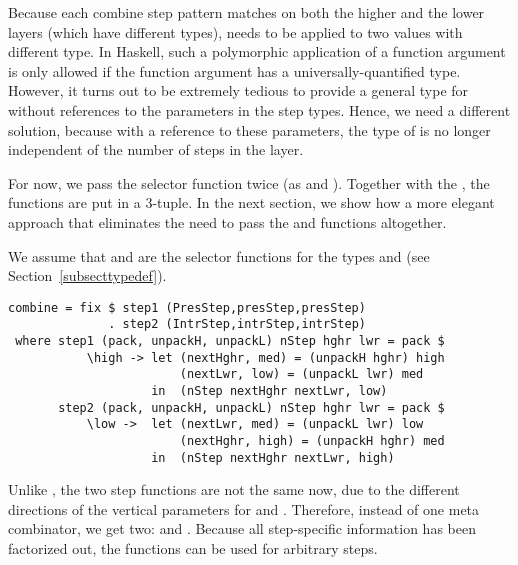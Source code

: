 \documentclass[preprint,natbib]{sigplanconf}
\begin{document}
Because each combine step pattern matches on both the higher and the lower layers (which have different types),  needs to be applied to two values with different type. In Haskell, such a polymorphic application of a function argument is only allowed if the function argument has a universally-quantified type. However, it turns out to be extremely tedious to provide a general type for  without references to the parameters in the step types. Hence, we need a different solution, because with a reference to these parameters, the type of  is no longer independent of the number of steps in the layer.

For now, we pass the selector function twice (as  and ).  Together with the , the  functions are put in a 3-tuple. In the next section, we show how a more elegant approach that eliminates the need to pass the  and  functions altogether.

We assume that  and  are the selector functions for the types  and  (see Section~\ref{subsecttypedef}).

\begin{small}
\begin{verbatim}
combine = fix $ step1 (PresStep,presStep,presStep) 
              . step2 (IntrStep,intrStep,intrStep) 
 where step1 (pack, unpackH, unpackL) nStep hghr lwr = pack $
           \high -> let (nextHghr, med) = (unpackH hghr) high
                        (nextLwr, low) = (unpackL lwr) med
                    in  (nStep nextHghr nextLwr, low)
       step2 (pack, unpackH, unpackL) nStep hghr lwr = pack $
           \low ->  let (nextLwr, med) = (unpackL lwr) low
                        (nextHghr, high) = (unpackH hghr) med
                    in  (nStep nextHghr nextLwr, high)
\end{verbatim}%
\end{small}

Unlike , the two step functions are not the same now, due to the different directions of the vertical parameters for  and . Therefore, instead of one meta combinator, we get two:  and . Because all step-specific information has been factorized out, the functions can be used for arbitrary steps.
\end{document}
